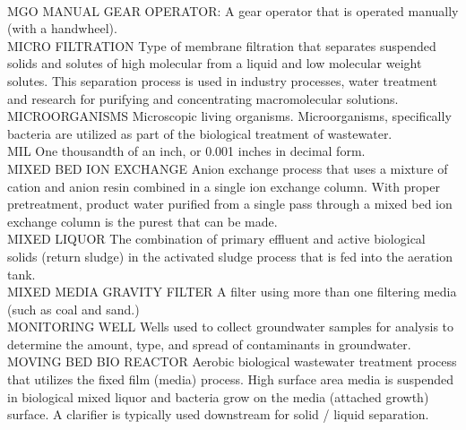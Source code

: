 \vspace{0.3cm}\\
MGO
MANUAL GEAR OPERATOR:  A gear operator that is operated manually (with a handwheel).
\vspace{0.3cm}\\
MICRO FILTRATION
Type of membrane filtration that separates suspended solids and solutes of high molecular from a liquid and low molecular weight solutes. This separation process is used in industry processes, water treatment and research for purifying and concentrating macromolecular solutions.
\vspace{0.3cm}\\
MICROORGANISMS
Microscopic living organisms. Microorganisms, specifically bacteria are utilized as part of the biological treatment of wastewater.
\vspace{0.3cm}\\
MIL
One thousandth of an inch, or 0.001 inches in decimal form.
\vspace{0.3cm}\\

MIXED BED ION EXCHANGE
Anion exchange process that uses a mixture of cation and anion resin combined in a single ion exchange column. With proper pretreatment, product water purified from a single pass through a mixed bed ion exchange column is the purest that can be made.
\vspace{0.3cm}\\
MIXED LIQUOR
The combination of primary effluent and active biological solids (return sludge) in the activated sludge process that is fed into the aeration tank.
\vspace{0.3cm}\\
MIXED MEDIA GRAVITY FILTER
A filter using more than one filtering media (such as coal and sand.)
\vspace{0.3cm}\\
MONITORING WELL
Wells used to collect groundwater samples for analysis to determine the amount, type, and spread of contaminants in groundwater.
\vspace{0.3cm}\\
MOVING BED BIO REACTOR
Aerobic biological wastewater treatment process that utilizes the fixed film (media) process. High surface area media is suspended in biological mixed liquor and bacteria grow on the media (attached growth) surface. A clarifier is typically used downstream for solid / liquid separation.
\vspace{0.3cm}\\

